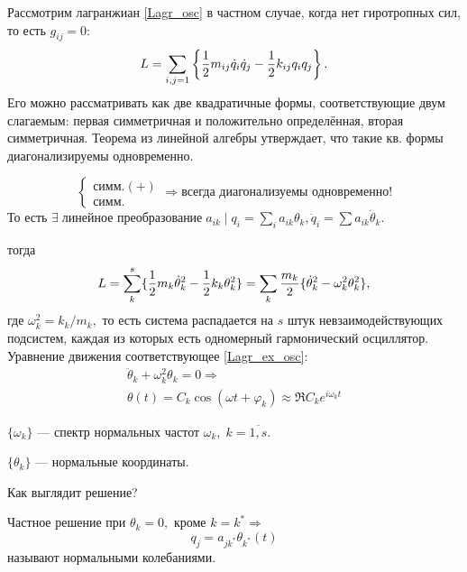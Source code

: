 \begin{ex}[$g_{ij} = 0$]
Рассмотрим лагранжиан \eqref{Lagr_osc} в частном случае, когда нет гиротропных сил, то есть $g_{ij} = 0$:
\begin{equation}
L = \sum_{i, j = 1} \left\lbrace \frac{1}{2} m_{ij} \dot{q}_i \dot{q}_j  - \frac{1}{2} k_{ij} q_i q_j \right\rbrace.
\end{equation}
Его можно рассматривать как две квадратичные формы, соответствующие двум слагаемым: первая симметричная и положительно определённая, вторая симметричная. Теорема из линейной алгебры утверждает, что такие кв. формы диагонализируемы одновременно.
\begin{thm}
$$
\left\{
\begin{array}{rcl}
\text{симм.$(+)$}\\
\text{симм.}
\end{array}
\right.
\Rightarrow \text{всегда диагонализуемы одновременно!}
$$
То есть $\exists\; \text{линейное преобразование}\; a_{ik}\; |\; q_i = \sum_i a_{ik} \theta_k, \dot{q}_i = \sum a_{ik} \dot{\theta}_k.$
\end{thm}
 тогда
\begin{equation}
L = \sum^s_k \lbrace \frac{1}{2} m_k \dot{\theta}_k^2 - \frac{1}{2} k_k \theta_k^2 \rbrace = \sum_k \frac{m_k}{2} \lbrace \dot{\theta}_k^2 - \omega^2_k \theta_k^2 \rbrace, \label{Lagr_ex_osc}
\end{equation}
где $\omega_k^2 = k_k / m_k,$ то есть система распадается на $s$ штук невзаимодействующих подсистем, каждая из которых есть  одномерный гармонический осциллятор.
Уравнение движения соответствующее \eqref{Lagr_ex_osc}:
\begin{gather}
\ddot{\theta}_k + \omega^2_k \theta_k = 0 \Rightarrow\\
\theta(t) = C_k \cos (\omega t + \varphi_k)  \approx \Re C_k e^{i \omega_ kt}
\end{gather}
\begin{dfn}
$\{\omega_k\}$ --- спектр нормальных частот $\omega_k,\; k = \overline{1, s}.$
\end{dfn}
\begin{dfn}
$\{\theta_k\}$ --- нормальные координаты.
\end{dfn}
Как выглядит решение? 
\begin{dfn}
Частное решение при $\theta_k = 0,$ кроме $k = k^* \Rightarrow$
\begin{equation}
q_j = a_{jk^*} \theta_{k^*}(t) 
\end{equation}
называют нормальными колебаниями.
\end{dfn}

\end{ex}
